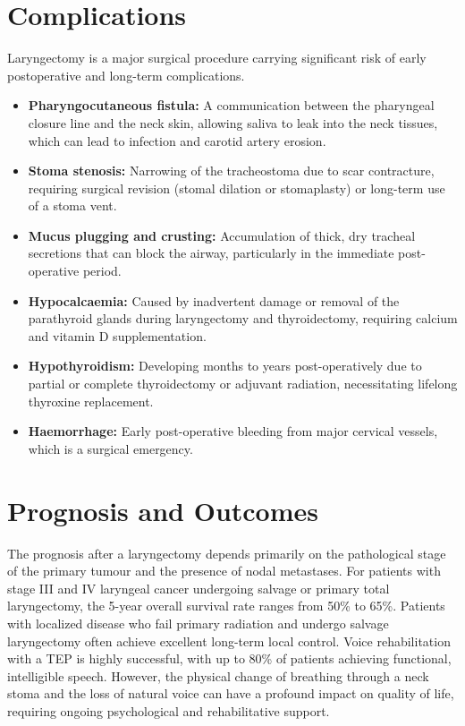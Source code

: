 \section*{Complications}
Laryngectomy is a major surgical procedure carrying significant risk of early postoperative and long-term complications.
\begin{itemize}
    \item \textbf{Pharyngocutaneous fistula:} A communication between the pharyngeal closure line and the neck skin, allowing saliva to leak into the neck tissues, which can lead to infection and carotid artery erosion.
    \item \textbf{Stoma stenosis:} Narrowing of the tracheostoma due to scar contracture, requiring surgical revision (stomal dilation or stomaplasty) or long-term use of a stoma vent.
    \item \textbf{Mucus plugging and crusting:} Accumulation of thick, dry tracheal secretions that can block the airway, particularly in the immediate post-operative period.
    \item \textbf{Hypocalcaemia:} Caused by inadvertent damage or removal of the parathyroid glands during laryngectomy and thyroidectomy, requiring calcium and vitamin D supplementation.
    \item \textbf{Hypothyroidism:} Developing months to years post-operatively due to partial or complete thyroidectomy or adjuvant radiation, necessitating lifelong thyroxine replacement.
    \item \textbf{Haemorrhage:} Early post-operative bleeding from major cervical vessels, which is a surgical emergency.
\end{itemize}

\section*{Prognosis and Outcomes}
The prognosis after a laryngectomy depends primarily on the pathological stage of the primary tumour and the presence of nodal metastases. For patients with stage III and IV laryngeal cancer undergoing salvage or primary total laryngectomy, the 5-year overall survival rate ranges from 50\% to 65\%. Patients with localized disease who fail primary radiation and undergo salvage laryngectomy often achieve excellent long-term local control. Voice rehabilitation with a TEP is highly successful, with up to 80\% of patients achieving functional, intelligible speech. However, the physical change of breathing through a neck stoma and the loss of natural voice can have a profound impact on quality of life, requiring ongoing psychological and rehabilitative support.


